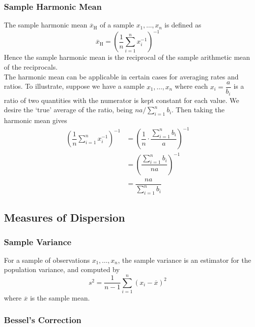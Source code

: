 \documentclass[11pt]{report} %
\begin{document}
\subsubsection{Sample Harmonic Mean}

The sample harmonic mean $\overline{x}_{\mathrm{H}}$ of a sample $x_{1}, \dots, x_{n}$ is defined as
\begin{equation}
\overline{x}_{\mathrm{H}} = \left(\dfrac{1}{n}\sum_{i = 1}^{n}x_{i}^{-1}\right)^{-1}
\end{equation}
Hence the sample harmonic mean is the reciprocal of the sample arithmetic mean of the reciprocals. \\

The harmonic mean can be applicable in certain cases for averaging rates and ratios. To illustrate, suppose we have a sample $x_{1}, \dots, x_{n}$ where each $x_{i} = \dfrac{a}{b_{i}}$ is a ratio of two quantities with the numerator is kept constant for each value. We desire the `true' average of the ratio, being $na/\sum_{i = 1}^{n}b_{i}$. Then taking the harmonic mean gives
\begin{align}
\left(\dfrac{1}{n}\sum_{i = 1}^{n}x_{i}^{-1}\right)^{-1} &= \left(\dfrac{1}{n}\cdot\dfrac{\sum_{i = 1}^{n}b_{i}}{a}\right)^{-1} \\
&= \left(\dfrac{\sum_{i = 1}^{n}b_{i}}{na}\right)^{-1} \\
&= \dfrac{na}{\sum_{i = 1}^{n}b_{i}}
\end{align}

\subsection{Measures of Dispersion}

\subsubsection{Sample Variance}

For a sample of observations $x_{1}, \dots, x_{n}$, the sample variance is an estimator for the population variance, and computed by
\begin{equation}
s^{2} = \dfrac{1}{n - 1}\sum_{i = 1}^{n}\left(x_{i} - \overline{x}\right)^{2}
\end{equation}
where $\overline{x}$ is the sample mean.

\subsubsection{Bessel's Correction}
\end{document}
